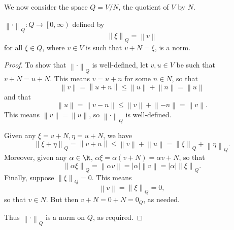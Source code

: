 \documentclass[pmath450]{subfiles}
\begin{document}
    We now consider the space $Q=V /N$, the quotient of $V$ by $N$. 

    \begin{lemma}{}
        $\left\lVert \cdot\right\rVert_Q:Q\to\left[ 0,\infty \right)$ defined by
        \begin{equation*}
            \left\lVert \xi\right\rVert_Q = \left\lVert v\right\rVert
        \end{equation*}
        for all $\xi\in Q$, where $v\in V$ is such that $v+N=\xi$, is a norm.
    \end{lemma}

    \begin{proof}
        To show that $\left\lVert \cdot\right\rVert_Q$ is well-defined, let $v,u\in V$ be such that $v+N=u+N$. This means $v=u+n$ for some $n\in N$, so that
        \begin{equation*}
            \left\lVert v\right\rVert = \left\lVert u+n\right\rVert \leq \left\lVert u\right\rVert+\left\lVert n\right\rVert = \left\lVert u\right\rVert
        \end{equation*}
        and that
        \begin{equation*}
            \left\lVert u\right\rVert = \left\lVert v-n\right\rVert \leq \left\lVert v\right\rVert+\left\lVert -n\right\rVert = \left\lVert v\right\rVert.
        \end{equation*}
        This means $\left\lVert v\right\rVert=\left\lVert u\right\rVert$, so $\left\lVert \cdot\right\rVert_Q$ is well-defined.

        Given any $\xi=v+N, \eta=u+N$, we have
        \begin{equation*}
            \left\lVert \xi+\eta\right\rVert_Q = \left\lVert v+u\right\rVert \leq \left\lVert v\right\rVert+\left\lVert u\right\rVert = \left\lVert \xi\right\rVert_Q + \left\lVert \eta\right\rVert_Q.
        \end{equation*}
        Moreover, given any $\alpha\in\R$, $\alpha\xi = \alpha\left( v+N \right) = \alpha v+N$, so that
        \begin{equation*}
            \left\lVert \alpha\xi\right\rVert_Q = \left\lVert \alpha v\right\rVert = \left| \alpha \right|\left\lVert v\right\rVert = \left| \alpha \right|\left\lVert \xi\right\rVert_Q.
        \end{equation*}
        Finally, suppose $\left\lVert \xi\right\rVert_Q = 0$. This means
        \begin{equation*}
            \left\lVert v\right\rVert = \left\lVert \xi\right\rVert_Q = 0,
        \end{equation*}
        so that $v\in N$. But then $v+N = 0+N = 0_Q$, as needed.

        Thus $\left\lVert \cdot\right\rVert_Q$ is a norm on $Q$, as required.
    \end{proof}
    
\end{document}
